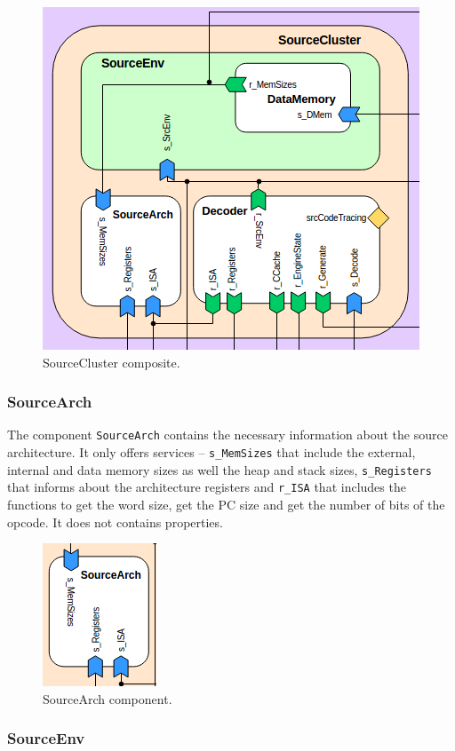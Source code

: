 \documentclass[11pt]{report}
\begin{document}
		\begin{figure} [H]
			\centering
			\includegraphics[width=0.6\linewidth]{Images/arch-ref/SourceCluster}
			\caption{SourceCluster composite.}
			\label{fig:SourceCluster}
		\end{figure}
		
			\subsubsection{SourceArch}
			
			The component \texttt{SourceArch} contains the necessary information about the source architecture. It only offers services -- \texttt{s\_MemSizes} that include the external, internal and data memory sizes as well the heap and stack sizes, \texttt{s\_Registers} that informs about the architecture registers and \texttt{r\_ISA} that includes the functions to get the word size, get the PC size and get the number of bits of the opcode. It does not contains properties.
			
			\begin{figure} [H]
				\centering
				\includegraphics[width=0.25\linewidth]{Images/arch-ref/SourceArch}
				\caption{SourceArch component.}
				\label{fig:SourceArch}
			\end{figure}
		
			\subsubsection{SourceEnv}
			
\end{document}
